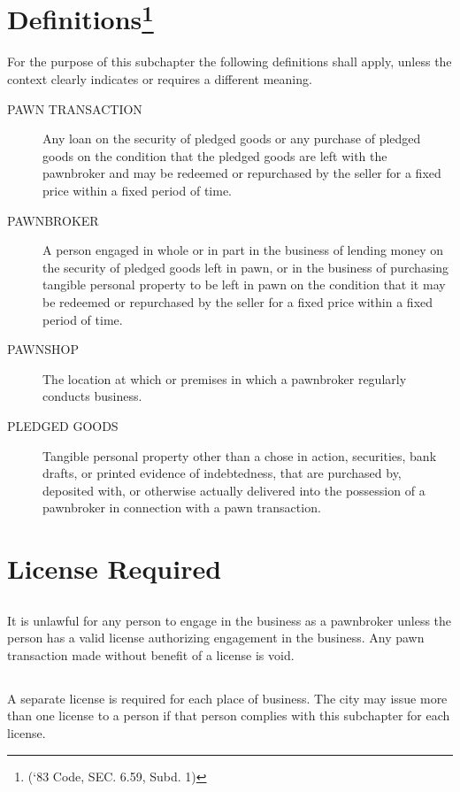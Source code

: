 
\setcounter{section}{29}
\section{Definitions\footnote{(‘83 Code, SEC. 6.59, Subd. 1)}}
For the purpose of this subchapter the following definitions shall apply, unless the context clearly indicates or requires a different meaning.
\begin{description}
    \item[PAWN TRANSACTION] Any loan on the security of pledged goods or any purchase of pledged goods on the condition that the pledged goods are left with the pawnbroker and may be redeemed or repurchased by the seller for a fixed price within a fixed period of time.
    \item[PAWNBROKER] A person engaged in whole or in part in the business of lending money on the security of pledged goods left in pawn, or in the business of purchasing tangible personal property to be left in pawn on the condition that it may be redeemed or repurchased by the seller for a fixed price within a fixed period of time.
    \item[PAWNSHOP] The location at which or premises in which a pawnbroker regularly conducts business.
    \item[PLEDGED GOODS] Tangible personal property other than a chose in action, securities, bank drafts, or printed evidence of indebtedness, that are purchased by, deposited with, or otherwise actually delivered into the possession of a pawnbroker in connection with a pawn transaction.
\end{description}

\section{License Required}
\subsection{}
It is unlawful for any person to engage in the business as a pawnbroker unless the person has a valid license authorizing engagement in the business. Any pawn transaction made without benefit of a license is void.
\subsection{}
A separate license is required for each place of business. The city may issue more than one license to a person if that person complies with this subchapter for each license.
